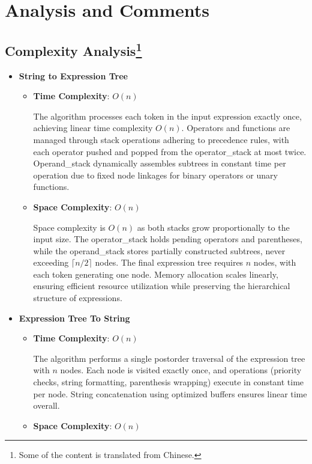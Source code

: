 \documentclass{report}
\begin{document}
\newpage
\chapter{Analysis and Comments}
\section*{Complexity Analysis\footnote{Some of the content is translated from Chinese.}}
\begin{itemize}
    \item \textbf{String to Expression Tree}
    \begin{itemize}
        \item \textbf{Time Complexity}: $O(n)$  

        The algorithm processes each token in the input expression exactly once, achieving linear time complexity $O(n)$. Operators and functions are managed through stack operations adhering to precedence rules, with each operator pushed and popped from the operator\_stack at most twice. Operand\_stack dynamically assembles subtrees in constant time per operation due to fixed node linkages for binary operators or unary functions.
        
        \item \textbf{Space Complexity}: $O(n)$  
        
        Space complexity is \(O(n)\) as both stacks grow proportionally to the input size. The operator\_stack holds pending operators and parentheses, while the operand\_stack stores partially constructed subtrees, never exceeding \(\lceil n/2 \rceil\) nodes. The final expression tree requires \(n\) nodes, with each token generating one node. Memory allocation scales linearly, ensuring efficient resource utilization while preserving the hierarchical structure of expressions.
    \end{itemize}
    
    \item \textbf{Expression Tree To String}
    \begin{itemize}
        \item \textbf{Time Complexity}: $O(n)$  

        The algorithm performs a single postorder traversal of the expression tree with \(n\) nodes. Each node is visited exactly once, and operations (priority checks, string formatting, parenthesis wrapping) execute in constant time per node. String concatenation using optimized buffers ensures linear time overall.
        \item \textbf{Space Complexity}: $O(n)$  


\end{itemize}
\end{itemize}
\end{document}
